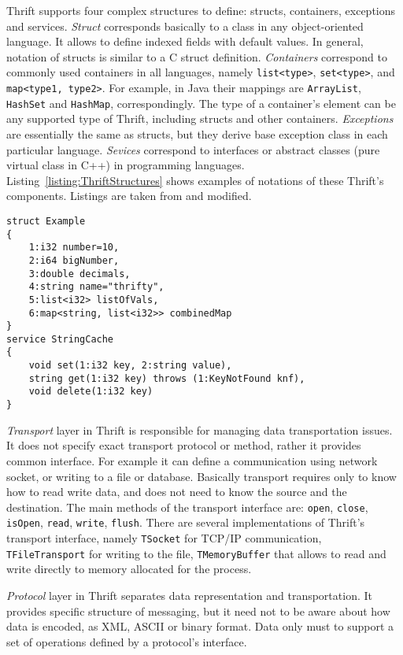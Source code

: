 Thrift supports four complex structures to define: structs, containers, exceptions and services.
\textit{Struct} corresponds basically to a class in any object-oriented language.
It allows to define indexed fields with default values.
In general, notation of structs is similar to a C struct definition.
\textit{Containers} correspond to commonly used containers in all languages, namely \lstinline{list<type>}, \lstinline{set<type>}, and \lstinline{map<type1, type2>}.
For example, in Java their mappings are \lstinline{ArrayList}, \lstinline{HashSet} and \lstinline{HashMap}, correspondingly.
The type of a container's element can be any supported type of Thrift, including structs and other containers.
\textit{Exceptions} are essentially the same as structs, but they derive base exception class in each particular language.
\textit{Sevices} correspond to interfaces or abstract classes (pure virtual class in C++) in programming languages.
Listing~\ref{listing:ThriftStructures} shows examples of notations of these Thrift's components.
Listings are taken from \cite{Slee2007} and modified.

\begin{lstlisting}[float=h, caption=Notation of Thrift's data structures., label=listing:ThriftStructures]
struct Example
{
	1:i32 number=10,
	2:i64 bigNumber,
	3:double decimals,
	4:string name="thrifty",
	5:list<i32> listOfVals,
	6:map<string, list<i32>> combinedMap
}
service StringCache
{
	void set(1:i32 key, 2:string value),
	string get(1:i32 key) throws (1:KeyNotFound knf),
	void delete(1:i32 key)
}
\end{lstlisting}

\textit{Transport}  layer in Thrift is responsible for managing data transportation issues.
It does not specify exact transport protocol or method, rather it provides common interface.
For example it can define a communication using network socket, or writing to a file or database.
Basically transport requires only to know how to read write data, and does not need to know the source and the destination.
The main methods of the transport interface are: \lstinline{open}, \lstinline{close}, \lstinline{isOpen}, \lstinline{read}, \lstinline{write}, \lstinline{flush}.
There are several implementations of Thrift's transport interface, namely \lstinline{TSocket} for TCP/IP communication, \lstinline{TFileTransport} for writing to the file, \lstinline{TMemoryBuffer} that allows to read and write directly to memory allocated for the process.

\textit{Protocol}  layer in Thrift separates data representation and transportation.
It provides specific structure of messaging, but it need not to be aware about how data is encoded, as XML, ASCII or binary format.
Data only must to support a set of operations defined by a protocol's interface.

